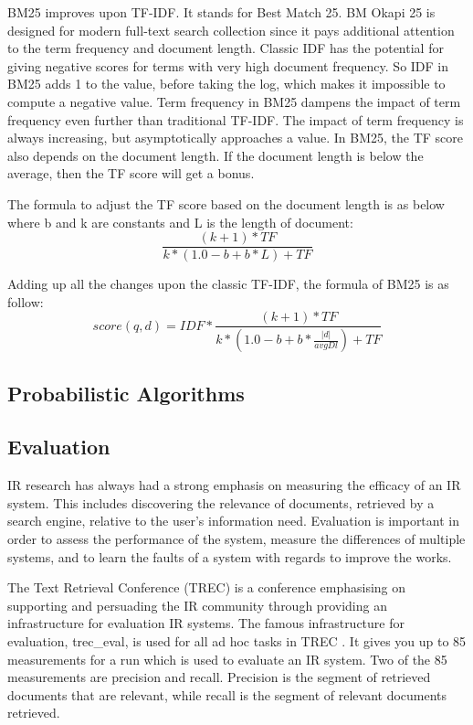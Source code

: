 BM25 improves upon TF-IDF. It stands for Best Match 25. BM Okapi 25 is designed for modern full-text search collection since it pays additional attention to the term frequency and document length. Classic IDF has the potential for giving negative scores for terms with very high document frequency. So IDF in BM25 adds 1 to the value, before taking the log, which makes it impossible to compute a negative value. Term frequency in BM25 dampens the impact of term frequency even further than traditional TF-IDF. The impact of term frequency is always increasing, but asymptotically approaches a value. In BM25, the TF score also depends on the document length. If the document length is below the average, then the TF score will get a bonus. 

The formula to adjust the TF score based on the document length is as below where b and k are constants and L is the length of document:
\[\frac{(k + 1) * TF}{k * (1.0 - b + b * L) + TF}\]

Adding up all the changes upon the classic TF-IDF, the formula of BM25 is as follow:
\[score(q,d)=IDF * \frac{(k + 1) * TF}{k * (1.0 - b + b * \frac{|d|}{avgDl}) + TF}
\]


\subsection{Probabilistic Algorithms} %
\label{sub:probabilistic_algorithms}


\subsection{Evaluation} %
\label{sub:evaluation}

IR research has always had a strong emphasis on measuring the efficacy of an IR system. This includes discovering the relevance of documents, retrieved by a search engine, relative to the user's information need. Evaluation is important in order to assess the performance of the system, measure the differences of multiple systems, and to learn the faults of a system with regards to improve the works.

The Text Retrieval Conference (TREC) is a conference emphasising on supporting and persuading the IR community through providing an infrastructure for evaluation IR systems. The famous infrastructure for evaluation, trec\_eval, is used for all ad hoc tasks in TREC \cite{voorhees:evaluation}. It gives you up to 85 measurements for a run which is used to evaluate an IR system. Two of the 85 measurements are precision and recall. Precision is the segment of retrieved documents that are relevant, while recall is the segment of relevant documents retrieved.


